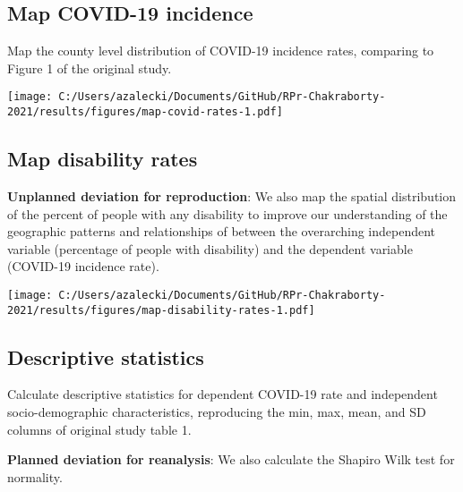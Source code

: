 \documentclass[
]{article}
\begin{document}
\hypertarget{map-covid-19-incidence}{%
\subsection{Map COVID-19 incidence}\label{map-covid-19-incidence}}

Map the county level distribution of COVID-19 incidence rates, comparing
to Figure 1 of the original study.

\texttt{[image: C:/Users/azalecki/Documents/GitHub/RPr-Chakraborty-2021/results/figures/map-covid-rates-1.pdf]}

\hypertarget{map-disability-rates}{%
\subsection{Map disability rates}\label{map-disability-rates}}

\textbf{Unplanned deviation for reproduction}: We also map the spatial
distribution of the percent of people with any disability to improve our
understanding of the geographic patterns and relationships of between
the overarching independent variable (percentage of people with
disability) and the dependent variable (COVID-19 incidence rate).

\texttt{[image: C:/Users/azalecki/Documents/GitHub/RPr-Chakraborty-2021/results/figures/map-disability-rates-1.pdf]}

\hypertarget{descriptive-statistics}{%
\subsection{Descriptive statistics}\label{descriptive-statistics}}

Calculate descriptive statistics for dependent COVID-19 rate and
independent socio-demographic characteristics, reproducing the min, max,
mean, and SD columns of original study table 1.

\textbf{Planned deviation for reanalysis}: We also calculate the Shapiro
Wilk test for normality.
\end{document}
